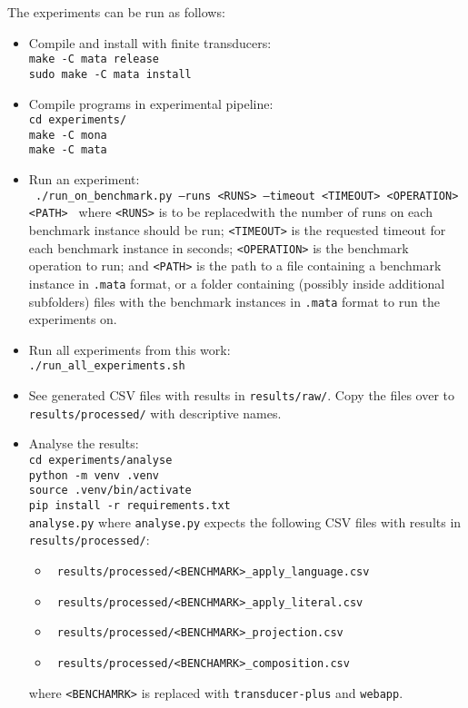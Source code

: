 The experiments can be run as follows:
\begin{itemize}
  \item Compile and install \mata with finite transducers:
  \\
  \texttt{make -C mata release}
  \\
  \texttt{sudo make -C mata install}

  \item Compile programs in experimental pipeline:
  \\
  \texttt{cd experiments/}
  \\
  \texttt{make -C mona}
  \\
  \texttt{make -C mata}

  \item Run an experiment:
  \\
  \texttt{
    ./run\_on\_benchmark.py --runs <RUNS> --timeout <TIMEOUT> <OPERATION> <PATH>
  }
  where \texttt{<RUNS>} is to be replacedwith the number of runs on each benchmark instance should be run; \texttt{<TIMEOUT>} is the requested timeout for each benchmark instance in seconds; \texttt{<OPERATION>} is the benchmark operation to run; and \texttt{<PATH>} is the path to a file containing a benchmark instance in \texttt{.mata} format, or a folder containing (possibly inside additional subfolders) files with the benchmark instances in \texttt{.mata} format to run the experiments on.

  \item Run all experiments from this work:
  \\
  \texttt{./run\_all\_experiments.sh}

  \item See generated CSV files with results in \texttt{results/raw/}. Copy the files over to \texttt{results/processed/} with descriptive names.

  \item Analyse the results:
  \\
  \texttt{cd experiments/analyse}
  \\
  \texttt{python -m venv .venv}
  \\
  \texttt{source .venv/bin/activate}
  \\
  \texttt{pip install -r requirements.txt}
  \\
  \texttt{analyse.py}
  where \texttt{analyse.py} expects the following CSV files with results in \texttt{results/processed/}:
  \begin{itemize}
    \item \texttt{
    results/processed/<BENCHMARK>\_apply\_language.csv
    }
    \item \texttt{
      results/processed/<BENCHMARK>\_apply\_literal.csv
    }

    \item \texttt{
results/processed/<BENCHMARK>\_projection.csv
    }

    \item \texttt{
results/processed/<BENCHAMRK>\_composition.csv
    }
  \end{itemize}
  where \texttt{<BENCHAMRK>} is replaced with \texttt{transducer-plus} and \texttt{webapp}.

\end{itemize}


